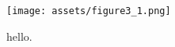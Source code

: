 


\begin{figure}[ht] %
    \centering
    \texttt{[image: assets/figure3\_1.png]} %
    \caption{hello.}
\end{figure}
